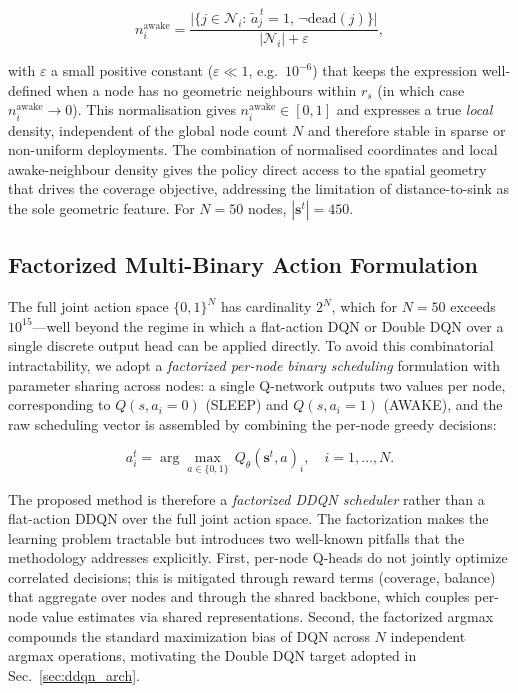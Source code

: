 \documentclass[journal]{IEEEtran}
\begin{document}
\begin{equation}
  n_i^{\text{awake}} = \frac{\Big|\big\{ j \in \mathcal{N}_i :\,
        \tilde{a}_j^{\,t} = 1,\, \neg\text{dead}(j) \big\}\Big|}
        {|\mathcal{N}_i| + \varepsilon},
  \label{eq:awake_density}
\end{equation}

with $\varepsilon$ a small positive constant ($\varepsilon \ll 1$,
e.g.\ $10^{-6}$) that keeps the expression well-defined when a node
has no geometric neighbours within $r_s$ (in which case $n_i^{\text{awake}}
\to 0$). This normalisation gives $n_i^{\text{awake}} \in [0, 1]$ and
expresses a true \emph{local} density, independent of the global node
count $N$ and therefore stable in sparse or non-uniform deployments.
The combination of normalised coordinates and local awake-neighbour
density gives the policy direct access to the spatial geometry that
drives the coverage objective, addressing the limitation of
distance-to-sink as the sole geometric feature. For $N = 50$ nodes,
$|\mathbf{s}^t| = 450$.

\subsection{Factorized Multi-Binary Action Formulation}
\label{sec:action_factor}

The full joint action space $\{0,1\}^N$ has cardinality $2^N$, which for
$N = 50$ exceeds $10^{15}$—well beyond the regime in which a flat-action
DQN or Double DQN over a single discrete output head can be applied
directly. To avoid this combinatorial intractability, we adopt a
\textit{factorized per-node binary scheduling} formulation with
parameter sharing across nodes: a single Q-network outputs two values
per node, corresponding to $Q(s, a_i = 0)$ (SLEEP) and $Q(s, a_i = 1)$
(AWAKE), and the raw scheduling vector is assembled by combining the
per-node greedy decisions:

\begin{equation}
  a_i^t = \arg\max_{a \in \{0, 1\}}\, Q_\theta(\mathbf{s}^t, a)_i,
  \quad i = 1,\ldots,N.
  \label{eq:factorized_argmax}
\end{equation}

The proposed method is therefore a \textit{factorized DDQN scheduler}
rather than a flat-action DDQN over the full joint action space. The
factorization makes the learning problem tractable but introduces two
well-known pitfalls that the methodology addresses explicitly. First,
per-node Q-heads do not jointly optimize correlated decisions; this is
mitigated through reward terms (coverage, balance) that aggregate over
nodes and through the shared backbone, which couples per-node value
estimates via shared representations. Second, the factorized argmax
compounds the standard maximization bias of DQN across $N$ independent
argmax operations, motivating the Double DQN target adopted in
Sec.~\ref{sec:ddqn_arch}.
\end{document}
